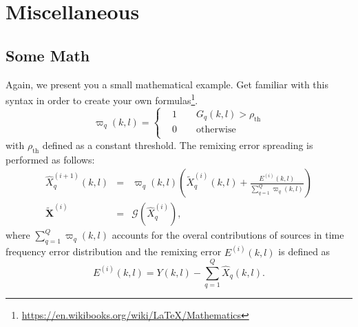 	
	\chapter{Miscellaneous}
	\section{Some Math}
	Again, we present you a small mathematical example. Get familiar with this syntax in order to create your own formulas\footnote{\url{https://en.wikibooks.org/wiki/LaTeX/Mathematics}}.
	\begin{equation}
	\varpi_q(k,l)=\begin{cases}
	&1\quad \quad G_q(k,l)>\rho_{\text{th}}\\
	&0\quad \quad \text{otherwise}\\
	\end{cases}
	\end{equation}
	with $\rho_{\text{th}}$ defined as a constant threshold. The remixing error spreading is performed as follows:
	\begin{eqnarray}
	\hat{X}^{(i+1)}_q(k,l)&=&{\varpi}_q(k,l)\left(\tilde{{X}}^{(i)}_q(k,l)+\frac{E^{(i)}(k,l)}{\sum_{q=1}^Q{{\varpi}_q(k,l)}}\right)\nonumber\\
	\tilde{\mathbf{X}}^{(i)}&=&\mathcal{G}(\hat{X}_q^{(i)}),
	\end{eqnarray}
	where $\sum_{q=1}^Q{{\varpi}_q(k,l)}$ accounts for the overal contributions of sources in time frequency error distribution and the remixing error $E^{(i)}(k,l)$ is defined as 
	\begin{equation}
	E^{(i)}(k,l)=Y(k,l)-\sum_{q=1}^{Q}{\hat{X}_q(k,l)}.
	\end{equation}
	
